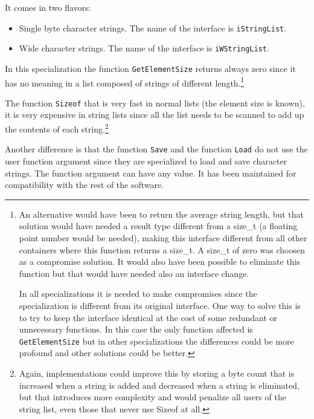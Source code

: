 \documentclass[12pt,a4paper]{memoir} %
\begin{document}
{It comes in two flavors:
\begin{itemize}
\item Single byte character strings. The name of the interface is \texttt{iStringList}.
\item Wide character strings. The name of the interface is \texttt{iWStringList}.
\end{itemize}
In this specialization the function \texttt{GetElementSize} returns always zero since it has no meaning in a list composed of strings of different
length.\footnote{An alternative would have been to return the average string length, but that solution would have needed a result type different from a 
size\_t (a floating point number would be needed), making this interface different from all other containers where this function returns a
size\_t. A size\_t of zero was choosen as a compromise solution. It would also have been possible to eliminate this function but that would have needed 
also an interface change.\par In all specializations it is needed to make compromises since the specialization is different from its original 
interface. One 
way to solve this is to try to keep the interface identical at the cost of some redundant or unnecessary functions. In this case the only function 
affected is \texttt{GetElementSize} but in other specializations the differences could be more profound and other solutions could be better.}

The function \texttt{Sizeof} that is very fast in normal lists (the element size is known), it is very expensive in string lists since all
the list needs to be scanned to add up the contents of each string.\footnote{Again, implementations could improve this by storing a byte count that
is increased when a string is added and decreased when a string is eliminated, but that introduces more complexity and would penalize all users
of the string list, even those that never use Sizeof at all.}

Another difference is that the function \texttt{Save} and the function \texttt{Load} do not use the user function argument since they are specialized
to load and save character strings. The function argument can have any value. It has been maintained for compatibility with the rest of the software.


\newpage
}
\end{document}
